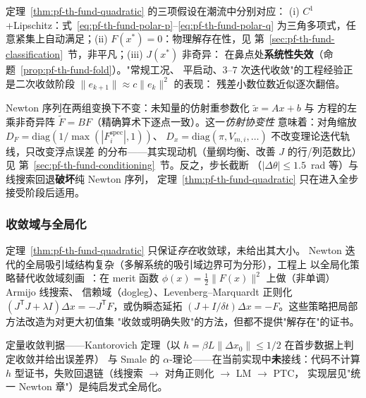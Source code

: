 \begin{remark}[潮流场景的条件核对]\label{rem:pf-th-fund-hypotheses}
定理~\ref{thm:pf-th-fund-quadratic} 的三项假设在潮流中分别对应：
(i) $C^1$+Lipschitz：式~\eqref{eq:pf-th-fund-polar-p}--\eqref{eq:pf-th-fund-polar-q}
为三角多项式，任意紧集上自动满足；(ii) $F(x^*)=0$：物理解存在性，见
第~\ref{sec:pf-th-fund-classification}~节，非平凡；(iii) $J(x^*)$ 非奇异：
在鼻点处\textbf{系统性失效}（命题~\ref{prop:pf-th-fund-fold}）。"常规工况、
平启动、$3$--$7$ 次迭代收敛"的工程经验正是二次收敛阶段
$\lVert e_{k+1}\rVert\approx c\lVert e_k\rVert^2$ 的表现：
残差小数位数近似逐次翻倍。
\end{remark}

\begin{remark}[仿射协变性与实现中的缩放]\label{rem:pf-th-fund-affine}
Newton 序列在两组变换下不变：未知量的仿射重参数化 $\tilde x=Ax+b$ 与
方程的左乘非奇异阵 $\tilde F=BF$（精确算术下逐点一致）。这一\emph{仿射协变性}
意味着：对角缩放 $D_F=\mathrm{diag}(1/\max(|F_i^{\mathrm{spec}}|,1))$、
$D_x=\mathrm{diag}(\pi,V_{m,i},\dots)$ 不改变理论迭代轨线，只改变浮点误差
的分布——其实现动机（量纲均衡、改善 $J$ 的行/列范数比）见
第~\ref{sec:pf-th-fund-conditioning}~节。反之，步长截断
（$|\Delta\theta|\le1.5$~rad 等）与线搜索回退\textbf{破坏}纯 Newton 序列，
定理~\ref{thm:pf-th-fund-quadratic} 只在进入全步接受阶段后适用。
\end{remark}

\subsubsection{收敛域与全局化}

定理~\ref{thm:pf-th-fund-quadratic} 只保证\emph{存在}收敛球，未给出其大小。
Newton 迭代的全局吸引域结构复杂（多解系统的吸引域边界可为分形），工程上
以全局化策略替代收敛域刻画~\cite{pff:nocedal-wright}：在 merit 函数
$\phi(x)=\tfrac12\lVert F(x)\rVert^2$ 上做（非单调）Armijo 线搜索、
信赖域（dogleg）、Levenberg--Marquardt 正则化
$(J^{\mathsf T}J+\lambda I)\Delta x=-J^{\mathsf T}F$，或伪瞬态延拓
$(J+I/\delta t)\Delta x=-F$。这些策略把局部方法改造为对更大初值集
"收敛或明确失败"的方法，但都不提供"解存在"的证书。

\begin{gapnote}
定量收敛判据——Kantorovich 定理（以
$h=\beta L\lVert\Delta x_0\rVert\le1/2$ 在首步数据上判定收敛并给出误差界）
与 Smale 的 $\alpha$-理论——在当前实现中\textbf{未}接线：代码不计算
$h$ 型证书，失败回退链（线搜索 $\to$ 对角正则化 $\to$ LM $\to$ PTC，
实现层见"统一 Newton 章"）是纯启发式全局化。
\end{gapnote}

